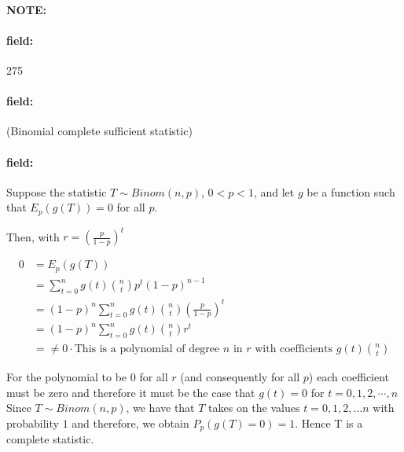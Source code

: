 \documentclass[12pt]{article}
\newenvironment{note}{\paragraph{NOTE:}}{}
\newenvironment{field}{\paragraph{field:}}{}
\begin{document}
\begin{note} \begin{field} \tiny 275 \end{field}
  \begin{field}
    (Binomial complete sufficient statistic)
  \end{field}
  \begin{field}
    Suppose the statistic $T \sim Binom(n,p)$, $0 < p < 1$, and let $g$ be a function such that $E_p(g(T)) = 0$ for all $p$.

    Then, with $r = (\frac{p}{1-p})^t$

    \begin{align*}
      0 &= E_p(g(T))\\
      &= \sum_{t=0}^n g(t) \binom{n}{t}p^t(1-p)^{n-1}\\
      &= (1-p)^n \sum_{t = 0}^n g(t)\binom{n}{t}(\frac{p}{1-p})^t\\
      &= (1-p)^n \sum_{t = 0}^n g(t)\binom{n}{t}r^t\\
      &= \neq 0 \cdot \text{This is a polynomial of degree }n \text{ in } r \text{ with coefficients } g(t)\binom{n}{t}
    \end{align*}

    For the polynomial to be $0$ for all $r$ (and consequently for all $p$) each coefficient must be zero and therefore it must be the case that $g(t) = 0$ for $t = 0, 1, 2, \cdots , n$ Since $T \sim Binom(n,p)$, we have that $T$ takes on the values $t = 0,1,2,\ldots n$ with probability $1$ and therefore, we obtain $P_p(g(T)=0)=1$. Hence T is a complete statistic.
  \end{field}
\end{note}
\end{document}
